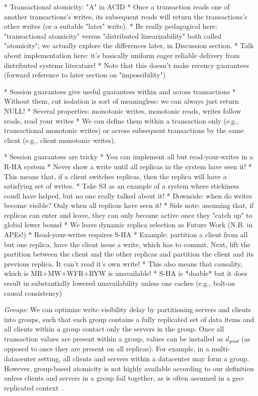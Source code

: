 * Transactional atomicity: "A" in ACID
	* Once a transaction reads one of another transactions's writes, its subsequent reads will return the transactions's other writes (or a suitable "later" write).
	* Be really pedagogical here: "transactional atomicity" versus "distributed linearizability" both called "atomicity"; we actually explore the differences later, in Discussion section.
	* Talk about implementation here: it's basically uniform eager reliable delivery from distributed systems literature!
	* Note that this doesn't make recency guarantees (forward reference to later section on "impossibility")

* Session guarantees give useful guarantees within and across transactions
	* Without them, cut isolation is sort of meaningless: we can always just return NULL!
	* Several properties: monotonic writes, monotonic reads, writes follow reads, read your writes
	* We can define them within a transaction only (e.g., transactional monotonic writes) or across subsequent transactions by the same client (e.g., client monotonic writes).

* Session guarantees are tricky
	* You can implement all but read-your-writes in a R-HA system
		* Never show a write until all replicas in the system have seen it!
		* This means that, if a client switches replicas, then the replica will have a satisfying set of writes.
                * Take S3 as an example of a system where stickiness coudl have helped, but no one really talked about it!
		* Downside: when do writes become visible? Only when all replicas have seen it!
		* Side note: assuming that, if replicas can enter and leave, they can only become active once they "catch up" to global lower bound
			* We leave dynamic replica selection as Future Work (N.B. in APEs!)
	* Read-your-writes requires S-HA
		* Example: partition a client from all but one replica, have the client issue a write, which has to commit. Next, lift the partition between the client and the other replicas and partition the client and its previous replica. It can't read it's own write!
		* This also means that causality, which is MR+MW+WFR+RYW is unavailable!
		* S-HA is *doable* but it does result in substantially lowered unavailability unless one caches (e.g., bolt-on causal consistency)

\noindent\textit{Groups:} We can optimize write visibility delay by
partitioning servers and clients into groups, such that each group
contains a fully replicated set of data items and all clients within a
group contact only the servers in the group. Once all transaction
values are present within a group, values can be installed as
$d_{good}$ (as opposed to once they are present on all replicas). For
example, in a multi-datacenter setting, all clients and servers within
a datacenter may form a group. However, group-based atomicity is not
highly available according to our definition unless clients and
servers in a group fail together, as is often assumed in a
geo-replicated context~\cite{cops, eiger}.

